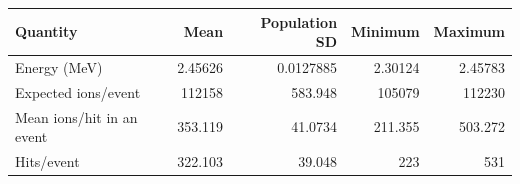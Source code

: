 \begin{tabular}{lrrrr}\toprule
Quantity & Mean & Population SD & Minimum & Maximum \\\midrule
Energy (MeV) & \num{2.45626} & \num{0.0127885} & \num{2.30124} & \num{2.45783} \\
Expected ions/event & \num{112158} & \num{583.948} & \num{105079} & \num{112230} \\
Mean ions/hit in an event & \num{353.119} & \num{41.0734} & \num{211.355} & \num{503.272} \\
Hits/event & \num{322.103} & \num{39.048} & \num{223} & \num{531} \\
\bottomrule\end{tabular}
